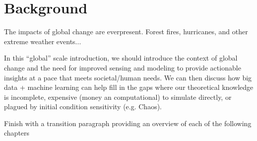 \chapter{Background}

The impacts of global change are everpresent. Forest fires, hurricanes, and other extreme weather events...


In this ``global'' scale introduction, we should introduce the context of global change and the need for improved sensing and modeling to provide actionable insights at a pace that meets societal/human needs. We can then discuss how big data + machine learning can help fill in the gaps where our theoretical knowledge is incomplete, expensive (money an computational) to simulate directly, or plagued by initial condition sensitivity (e.g. Chaos).

Finish with a transition paragraph providing an overview of each of the following chapters





